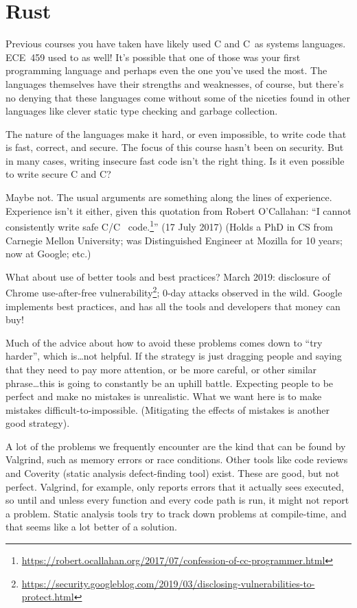 \documentclass[a4paper]{report}
\newcommand{\CPP}{C\nolinebreak\hspace{-.05em}\raisebox{.4ex}{\tiny\bf +}\nolinebreak\hspace{-.10em}\raisebox{.4ex}{\tiny\bf +}}
\def\CPP{{C\nolinebreak[4]\hspace{-.05em}\raisebox{.4ex}{\tiny\bf ++}}}
\begin{document}
\section*{Rust}

Previous courses you have taken have likely used C and \CPP~as systems languages. ECE~459 used to as well! It's possible that one of those was your first programming language and perhaps even the one you've used the most. The languages themselves have their strengths and weaknesses, of course, but there's no denying that these languages come without some of the niceties found in other languages like clever static type checking and garbage collection.

The nature of the languages make it hard, or even impossible, to write code that is fast, correct, and secure. The focus of this course hasn't been on security. But in many cases, writing insecure fast code isn't the right thing. Is it even possible to write secure C and \CPP?

Maybe not. The usual arguments are something along the lines of experience. Experience isn't it either, given this quotation from Robert O'Callahan: ``I cannot consistently write safe C/\CPP~ code.\footnote{\url{https://robert.ocallahan.org/2017/07/confession-of-cc-programmer.html}}'' (17 July 2017) (Holds a PhD in CS from Carnegie Mellon University; was Distinguished Engineer at Mozilla for 10 years; now at Google; etc.)

What about use of better tools and best practices? March 2019: disclosure of Chrome use-after-free vulnerability\footnote{\url{https://security.googleblog.com/2019/03/disclosing-vulnerabilities-to-protect.html}}; 0-day attacks
observed in the wild. Google implements best practices, and has all the tools and developers that
money can buy!

Much of the advice about how to avoid these problems comes down to ``try harder'', which is\ldots not helpful. If the strategy is just dragging people and saying that they need to pay more attention, or be more careful, or other similar phrase\ldots this is going to constantly be an uphill battle. Expecting people to be perfect and make no mistakes is unrealistic. What we want here is to make mistakes difficult-to-impossible. (Mitigating the effects of mistakes is another good strategy).

A lot of the problems we frequently encounter are the kind that can be found by Valgrind, such as memory errors or race conditions. Other tools like code reviews and Coverity (static analysis defect-finding tool) exist. These are good, but not perfect. Valgrind, for example, only reports errors that it actually sees executed, so until and unless every function and every code path is run, it might not report a problem. Static analysis tools try to track down problems at compile-time, and that seems like a lot better of a solution.
\end{document}
